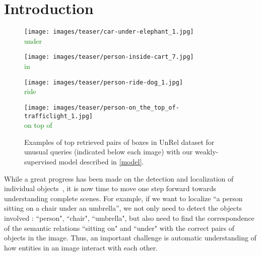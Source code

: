 \documentclass[10pt,twocolumn,letterpaper]{article}
\begin{document}
\section{Introduction}


\begin{figure}[t]
\centering
	\begin{minipage}[t]{0.23\textwidth}
    	\centering
    	\texttt{[image: images/teaser/car-under-elephant\_1.jpg]}\\
       	\color{blue}{car} \textcolor{Green}{under} \color{red}{elephant}
  		\vspace{1.5ex}
    \end{minipage}
    \begin{minipage}[t]{0.23\textwidth}
    	\centering
    	\texttt{[image: images/teaser/person-inside-cart\_7.jpg]}\\ 
    		\color{blue}{person} \textcolor{Green}{in} \color{red}{cart}
    		\vspace{1.5ex}
    \end{minipage}
    \begin{minipage}[t]{0.23\textwidth}
    	\centering
    	\texttt{[image: images/teaser/person-ride-dog\_1.jpg]}\\ 
 		\color{blue}{person} \textcolor{Green}{ride} \color{red}{dog}		
    \end{minipage}
    \begin{minipage}[t]{0.23\textwidth}
    	\centering
    	\texttt{[image: images/teaser/person-on\_the\_top\_of-trafficlight\_1.jpg]}\\
  		\color{blue}{person} \textcolor{Green}{on top of} \color{red}{traffic light}    	
    \end{minipage}
    \setlength\abovecaptionskip{0.2cm}
    \caption{Examples of top retrieved pairs of boxes in UnRel dataset for unusual queries (indicated below each image) with our weakly-supervised model described in \ref{model}.}
    \vspace{-.4cm}
    \label{teaser_figure}
\end{figure}




While a great progress has been made on the detection and localization of individual objects~\cite{ren15,zagoruyko2016multipath},
it is now time to move one step forward towards understanding complete scenes.
For example, if we want to localize ``a  person 
sitting on a chair under an umbrella'', we not only need to detect the objects
involved : ``person", ``chair", ``umbrella",  but also need to find the correspondence of the semantic relations ``sitting on" and
``under" with the correct pairs of objects in the image. Thus, an
important challenge is automatic understanding of how entities in an image interact with each other.  
\end{document}
